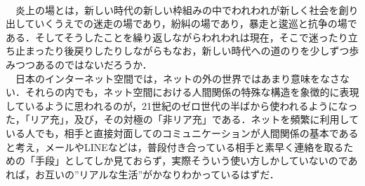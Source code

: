 \documentclass[uplatex,twocolumn,dvipdfmx]{jsarticle}
\begin{document}
\\　炎上の場とは，新しい時代の新しい枠組みの中でわれわれが新しく社会を創り出していくうえでの迷走の場であり，紛糾の場であり，暴走と逡巡と抗争の場である．そしてそうしたことを繰り返しながらわれわれは現在，そこで迷ったり立ち止まったり後戻りしたりしながらもなお，新しい時代への道のりを少しずつ歩みつつあるのではないだろうか．
\\　日本のインターネット空間では，ネットの外の世界ではあまり意味をなさない．それらの内でも，ネット空間における人間関係の特殊な構造を象徴的に表現しているように思われるのが，21世紀のゼロ世代の半ばから使われるようになった，「リア充」，及び，その対極の「非リア充」である．ネットを頻繁に利用している人でも，相手と直接対面してのコミュニケーションが人間関係の基本であると考え，メールやLINEなどは，普段付き合っている相手と素早く連絡を取るための「手段」としてしか見ておらず，実際そういう使い方しかしていないのであれば，お互いの”リアルな生活”がかなりわかっているはずだ．




\end{document}
